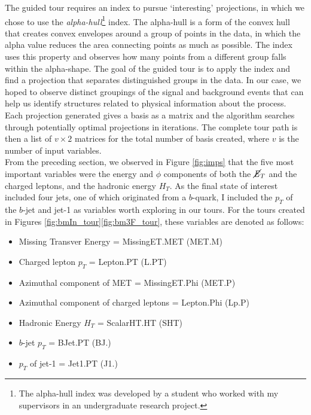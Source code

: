 The guided tour requires an index to pursue `interesting' projections, in which we chose to use the \textit{alpha-hull}\footnote{The alpha-hull index was developed by a student who worked with my supervisors in an undergraduate research project.} index. The alpha-hull is a form of the convex hull that creates convex envelopes around a group of points in the data, in which the alpha value reduces the area connecting points as much as possible. The index uses this property and observes how many points from a different group falls within the alpha-shape. The goal of the guided tour is to apply the index and find a projection that separates distinguished groups in the data. In our case, we hoped to observe distinct groupings of the signal and background events that can help us identify structures related to physical information about the process. Each projection generated gives a basis as a matrix and the algorithm searches through potentially optimal projections in iterations. The complete tour path is then a list of $v\times2$ matrices for the total number of basis created, where $v$ is the number of input variables. \\

From the preceding section, we observed in Figure \ref{fig:imps} that the five most important variables were the energy and $\phi$ components of both the $\cancel{\it{E}}_{T}$ and the charged leptons, and the hadronic energy $H_T$. As the final state of interest included four jets, one of which originated from a $b$-quark, I included the $p_T$ of the $b$-jet and jet-1 as variables worth exploring in our tours. For the tours created in Figures \ref{fig:bmIn_tour}\textemdash\ref{fig:bm3F_tour}, these variables are denoted as follows:

\begin{itemize}
    \item Missing Transver Energy = MissingET.MET (MET.M)
    \item Charged lepton $p_T$ = Lepton.PT (L.PT)
    \item Azimuthal component of MET = MissingET.Phi (MET.P)
    \item Azimuthal component of charged leptons = Lepton.Phi (Lp.P)
    \item Hadronic Energy $H_T$ = ScalarHT.HT (SHT)
    \item $b$-jet $p_T$ = BJet.PT (BJ.)
    \item $p_T$ of jet-1 = Jet1.PT (J1.)
\end{itemize}

